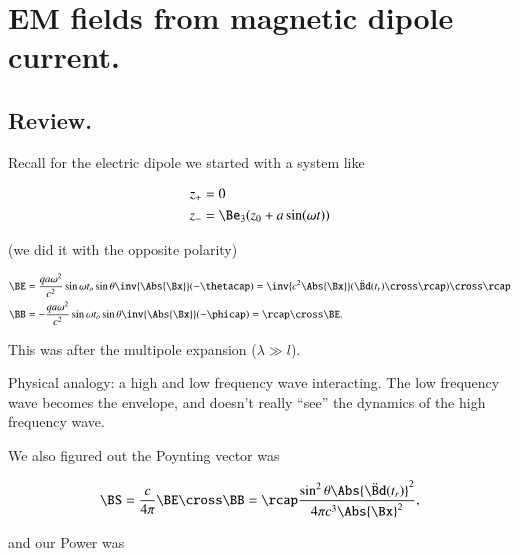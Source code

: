 %
%

\chapter{EM fields from magnetic dipole current.}
\label{chap:relativisticElectrodynamicsT8}
{}
\date{Mar 23, 2011}

\beginArtWithToc

\section{Review.}

Recall for the electric dipole we started with a system like

\begin{align}\label{eqn:relativisticElectrodynamicsT8:9}
z_{+} &= 0 \\
z_{-} &= \Be_3( z_0 + a \sin(\omega t))
\end{align}

(we did it with the opposite polarity)

\begin{align}\label{eqn:relativisticElectrodynamicsT8:10}
\BE &= \frac{q a \omega^2}{c^2} \sin\omega t_o \sin\theta \inv{\Abs{\Bx}} (- \thetacap ) = \inv{c^2 \Abs{\Bx}} (\ddot{\Bd}(t_r) \cross \rcap ) \cross \rcap  \\
\BB &= -\frac{q a \omega^2}{c^2} \sin\omega t_o \sin\theta \inv{\Abs{\Bx}} (- \phicap ) = \rcap \cross \BE.
\end{align}

This was after the multipole expansion ($\lambda \gg l$).

Physical analogy: a high and low frequency wave interacting.  The low frequency wave becomes the envelope, and doesn't really ``see'' the dynamics of the high frequency wave.

We also figured out the Poynting vector was

\begin{equation}\label{eqn:relativisticElectrodynamicsT8:30}
\BS = \frac{c}{4\pi} \BE \cross \BB = \rcap \frac{ \sin^2 \theta \Abs{\ddot{\Bd}(t_r) }^2 }{ 4 \pi c^3 \Abs{\Bx}^2},
\end{equation}

and our Power was

